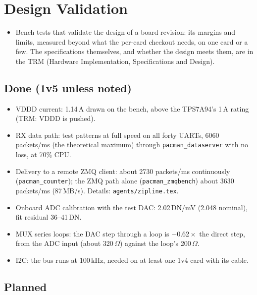 \documentclass[11pt]{article}
\begin{document}
\section{Design Validation}\label{sec:design}

\begin{itemize}
\item Bench tests that validate the design of a board revision:  its margins and limits, measured beyond what the
  per-card checkout needs, on one card or a few.  The specifications themselves, and whether the design meets them,
  are in the TRM (Hardware Implementation, Specifications and Design).
\end{itemize}

\subsection{Done (1v5 unless noted)}

\begin{itemize}
\item VDDD current:  1.14\,A drawn on the bench, above the TPS7A94's 1\,A rating (TRM:  VDDD is pushed).
\item RX data path:  test patterns at full speed on all forty UARTs, 6060 packets/ms (the theoretical maximum)
  through \texttt{pacman\_dataserver} with no loss, at 70\% CPU.
\item Delivery to a remote ZMQ client:  about 2730 packets/ms continuously (\texttt{pacman\_counter});  the ZMQ
  path alone (\texttt{pacman\_zmqbench}) about 3630 packets/ms (87\,MB/s).  Details:  \texttt{agents/zipline.tex}.
\item Onboard ADC calibration with the test DAC:  2.02\,DN/mV (2.048 nominal), fit residual 36--41\,DN.
\item MUX series loops:  the DAC step through a loop is $-0.62\times$ the direct step, from the ADC input (about
  320\,$\Omega$) against the loop's 200\,$\Omega$.
\item I2C:  the bus runs at 100\,kHz, needed on at least one 1v4 card with its cable.
\end{itemize}

\subsection{Planned}
\end{document}
